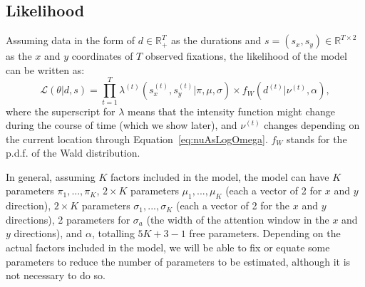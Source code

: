 \documentclass{article}
\begin{document}
\subsection{Likelihood}


Assuming data in the form of $d \in \mathbb{R}_+^T$ as the durations and $s = (s_x, s_y) \in \mathbb{R}^{T\times2}$ as the $x$ and $y$ coordinates of $T$ observed fixations, the likelihood of the model can be written as:
\begin{equation}
    \mathcal{L}(\theta | d, s) = \prod_{t=1}^T \lambda^{(t)}(s_x^{(t)}, s_y^{(t)} | \pi, \mu, \sigma) \times f_{W}(d^{(t)} | \nu^{(t)}, \alpha),
\end{equation}
where the superscript for $\lambda$ means that the intensity function might change during the course of time (which we show later), and $\nu^{(t)}$ changes depending on the current location through Equation~\ref{eq:nuAsLogOmega}. $f_W$ stands for the p.d.f. of the Wald distribution.

In general, assuming $K$ factors included in the model, the model can have $K$ parameters $\pi_1, ..., \pi_K$, $2\times K$ parameters $\mu_1, ..., \mu_K$ (each a vector of 2 for $x$ and $y$ direction), $2\times K$ parameters $\sigma_1, ..., \sigma_K$ (each a vector of 2 for the $x$ and $y$ directions), 2 parameters for $\sigma_a$ (the width of the attention window in the $x$ and $y$ directions), and $\alpha$, totalling $5K + 3 - 1$ free parameters. Depending on the actual factors included in the model, we will be able to fix or equate some parameters to reduce the number of parameters to be estimated, although it is not necessary to do so.




\end{document}
